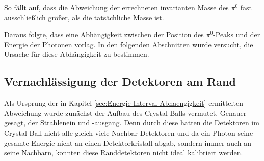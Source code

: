 \documentclass[a4paper,11pt,oneside,final,german,openbib,pdftex]{scrbook}
\begin{document}
{So fällt auf, dass die Abweichung der errechneten invarianten Masse des $\pi^0$ fast ausschließlich größer, als die tatsächliche Masse ist.
  
Daraus folgte, dass eine Abhängigkeit zwischen der Position des $\pi^0$-Peaks und der Energie der Photonen vorlag. In den folgenden Abschnitten wurde versucht, die Ursache für diese Abhängigkeit zu bestimmen.





\subsection{Vernachl\"assigung der Detektoren am Rand}
\label{sec:Vernachlaessigung-der-Detektoren-am-Rand}

Als Ursprung der in Kapitel \ref{sec:Energie-Interval-Abhaengigkeit} ermittelten Abweichung wurde zun\"achst der Aufbau des Crystal-Balls vermutet. Genauer gesagt, der Strahlenein und -ausgang. Denn durch diese hatten die Detektoren im Crystal-Ball nicht alle gleich viele Nachbar Detektoren und da ein Photon seine gesamte Energie nicht an einen Detektorkristall abgab, sondern immer auch an seine Nachbarn, konnten diese Randdetektoren nicht ideal kalibriert werden. 



}
\end{document}
